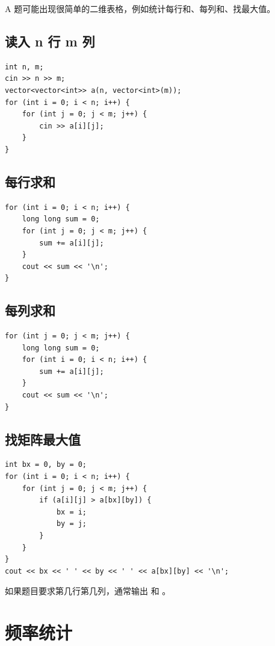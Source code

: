 A 题可能出现很简单的二维表格，例如统计每行和、每列和、找最大值。

\subsection{读入 n 行 m 列}

\begin{lstlisting}
int n, m;
cin >> n >> m;
vector<vector<int>> a(n, vector<int>(m));
for (int i = 0; i < n; i++) {
    for (int j = 0; j < m; j++) {
        cin >> a[i][j];
    }
}
\end{lstlisting}

\subsection{每行求和}

\begin{lstlisting}
for (int i = 0; i < n; i++) {
    long long sum = 0;
    for (int j = 0; j < m; j++) {
        sum += a[i][j];
    }
    cout << sum << '\n';
}
\end{lstlisting}

\subsection{每列求和}

\begin{lstlisting}
for (int j = 0; j < m; j++) {
    long long sum = 0;
    for (int i = 0; i < n; i++) {
        sum += a[i][j];
    }
    cout << sum << '\n';
}
\end{lstlisting}

\subsection{找矩阵最大值}

\begin{lstlisting}
int bx = 0, by = 0;
for (int i = 0; i < n; i++) {
    for (int j = 0; j < m; j++) {
        if (a[i][j] > a[bx][by]) {
            bx = i;
            by = j;
        }
    }
}
cout << bx << ' ' << by << ' ' << a[bx][by] << '\n';
\end{lstlisting}

如果题目要求第几行第几列，通常输出  和 。

\section{频率统计}\label{sec:05-18}

